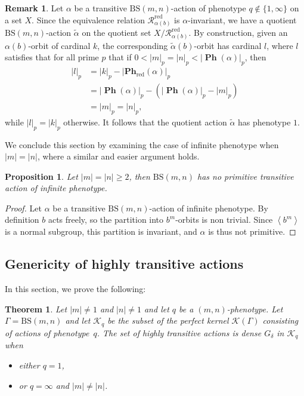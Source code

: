 \documentclass[12pt]{article}
\numberwithin{equation}{section}
\newtheorem{proposition}[equation]{Proposition}
\newtheorem{theorem}[equation]{Theorem}
\theoremstyle{definition}
\newtheorem{remark}[equation]{Remark}
\newcommand{\la}{\left\langle}
\newcommand{\ra}{\right\rangle}
\newcommand{\abs}[1]{\left\lvert #1\right\rvert}
\newcommand{\Rc}{\mathcal{R}}
\newcommand{\PK}{\mathcal{K}}
\newcommand\BSo{\mathrm{BS}}
\DeclareMathOperator\PHE{\mathbf{Ph}}
\newcommand\PHEred{\mathbf{Ph}_{\textrm{red}}}
\begin{document}
	\begin{remark}
		Let \( \alpha \) be a transitive \(\BSo(m,n)\)-action of phenotype \(q\notin\{1,\infty\}\)
		on a set \(X\).
		Since the equivalence relation \(\Rc^{\mathrm{red}}_{\alpha(b)}\) is \( \alpha \)-invariant,
		we have a quotient \(\BSo(m,n)\)-action \(\tilde\alpha\) on the quotient set \(X/\Rc^{\mathrm{red}}_{\alpha(b)}\).
		By construction, given an \(\alpha(b)\)-orbit of cardinal \(k\),
		the corresponding \(\tilde\alpha(b)\)-orbit has cardinal \(l\), where \(l\) satisfies that
		for all prime \(p\) that if \(0<\abs{m}_p=\abs{n}_p<\abs{\PHE(\alpha)}_p \), then
		\begin{align*}
		\abs{l}_p & = \abs{k}_p-\abs{\PHEred(\alpha)}_p \\
				  & = \abs{\PHE(\alpha)}_p- (\abs{\PHE(\alpha)}_p-\abs{m}_p) \\
				  & = \abs{m}_p=\abs{n}_p,
		\end{align*}
		while \(\abs{l}_p = \abs{k}_p\) otherwise. 
		It follows that the quotient action \(\tilde\alpha\) has phenotype \(1\). 
	\end{remark}

    We conclude this section by examining the case of infinite 
    phenotype when \(\abs m=\abs n\), where a similar and 
    easier argument holds.
    
    \begin{proposition}\label{prop: no primitive inf phen n=m}
        Let \(\abs m=\abs n \geq 2\), then \(\BSo(m,n)\) has 
        no primitive transitive action of infinite phenotype.
    \end{proposition}
    \begin{proof}
        Let \(\alpha\) be a transitive \(\BSo(m,n)\)-action of infinite
        phenotype. By definition \(b\) acts freely, so the partition into \( b^m \)-orbits is non trivial. Since \( \la b^m\ra \) is a normal subgroup, this partition
        is invariant, and \(\alpha\) is thus not primitive.
    \end{proof}

    
\subsection{Genericity of highly transitive actions}\label{Sect: generic HT}
In this section, we prove the following:

\begin{theorem}\label{th: HT generic in Ph= 1 and oo}
    Let $\abs{m}\neq 1$ and $\abs{n}\neq 1$ and let $q$ be a \( (m,n) \)-phenotype.
    Let $\Gamma=\BSo(m,n)$ and let $\PK_q $ be the subset of the perfect kernel $\PK(\Gamma)$ consisting of actions of phenotype~$q$.
    The set of highly transitive actions is dense \( G_\delta \)  in $\PK_q $ when 
    \begin{itemize}
        \item either $q=1$,  
        \item or $q=\infty$ and  $\abs{m} \neq \abs{n}$.
    \end{itemize}
\end{theorem}
\end{document}
